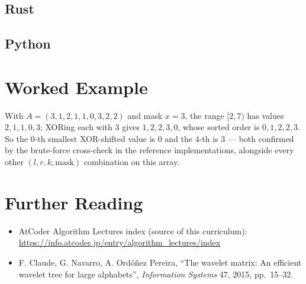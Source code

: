 \documentclass[11pt]{article}
\begin{document}
\codenote
\subsection{Rust}

\subsection{Python}

\section{Worked Example}
\begin{examplebox}
With $A = (3,1,2,1,1,0,3,2,2)$ and mask $x = 3$, the range $[2, 7)$ has
values $2,1,1,0,3$; XORing each with $3$ gives $1,2,2,3,0$, whose sorted
order is $0,1,2,2,3$. So the $0$-th smallest XOR-shifted value is $0$ and
the $4$-th is $3$ --- both confirmed by the brute-force cross-check in the
reference implementations, alongside every other $(l, r, k,
\mathrm{mask})$ combination on this array.
\end{examplebox}

\section{Further Reading}
\begin{itemize}[leftmargin=1.5em]
  \item AtCoder Algorithm Lectures index (source of this curriculum):
        \url{https://info.atcoder.jp/entry/algorithm_lectures/index}
  \item F. Claude, G. Navarro, A. Ordóñez Pereira, ``The wavelet matrix: An
        efficient wavelet tree for large alphabets'', \emph{Information
        Systems} 47, 2015, pp.\ 15--32.
\end{itemize}
\end{document}
